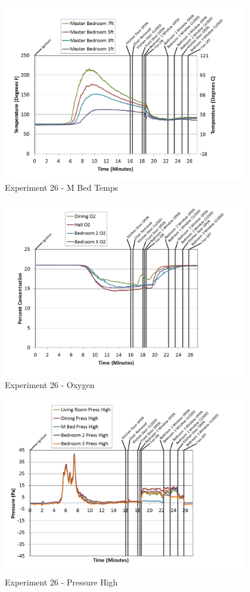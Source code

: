 \documentclass{article}
\begin{document}
\begin{appendices}
\begin{figure}[h!]
	\centering
	\includegraphics[height=3.05in]{0_Images/Results_Charts/Exp_26_Charts/MBedTemps.png}
	\caption{Experiment 26 - M Bed Temps}
\end{figure}

\clearpage

\begin{figure}[h!]
	\centering
	\includegraphics[height=3.05in]{0_Images/Results_Charts/Exp_26_Charts/Oxygen.png}
	\caption{Experiment 26 - Oxygen}
\end{figure}


\begin{figure}[h!]
	\centering
	\includegraphics[height=3.05in]{0_Images/Results_Charts/Exp_26_Charts/PressureHigh.png}
	\caption{Experiment 26 - Pressure High}
\end{figure}


\end{appendices}
\end{document}
